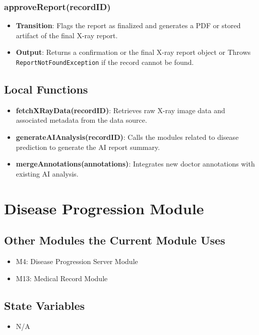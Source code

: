 \documentclass[12pt, titlepage]{article}
\begin{document}
\subsubsection{approveReport(recordID)}
\begin{itemize}
  \item \textbf{Transition}: Flags the report as finalized and generates a PDF or stored artifact of the final X-ray report.
  \item \textbf{Output}: 
    Returns a confirmation or the final X-ray report object or Throws \texttt{ReportNotFoundException} if the record cannot be found.
\end{itemize}

\newpage
\subsection{Local Functions}
\begin{itemize}
  \item \textbf{fetchXRayData(recordID)}: Retrieves raw X-ray image data and associated metadata from the data source.
  \item \textbf{generateAIAnalysis(recordID)}: Calls the modules related to disease prediction to generate the AI report summary.
  \item \textbf{mergeAnnotations(annotations)}: Integrates new doctor annotations with existing AI analysis.
\end{itemize}

\section{Disease Progression Module}
\label{Disease Progression Module}

\subsection{Other Modules the Current Module Uses}
\begin{itemize}
    \item M4: Disease Progression Server Module
    \item M13: Medical Record Module
\end{itemize}

\subsection{State Variables}
\begin{itemize}
    \item N/A
\end{itemize}
\end{document}
